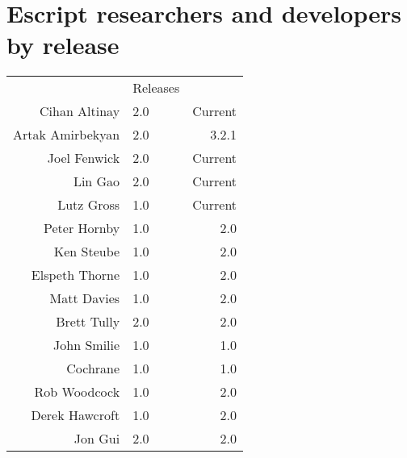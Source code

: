 
\chapter{Escript researchers and developers by release}

\begin{center}
\begin{tabular}{r|lr|}
& Releases\\ \cline{2-3}
Cihan Altinay & 2.0 & Current \\
Artak Amirbekyan & 2.0 & 3.2.1 \\
Joel Fenwick & 2.0 & Current \\
Lin Gao & 2.0 & Current \\
Lutz Gross & 1.0 & Current \\
Peter Hornby & 1.0 & 2.0 \\
Ken Steube & 1.0 & 2.0 \\
Elspeth Thorne & 1.0 & 2.0 \\
Matt Davies & 1.0 & 2.0 \\
Brett Tully & 2.0 & 2.0 \\
John Smilie & 1.0 & 1.0 \\
Cochrane & 1.0 & 1.0 \\
Rob Woodcock & 1.0 & 2.0 \\
Derek Hawcroft & 1.0 & 2.0 \\
Jon Gui & 2.0 & 2.0 \\
\cline{2-3}
\end{tabular}
\end{center}
